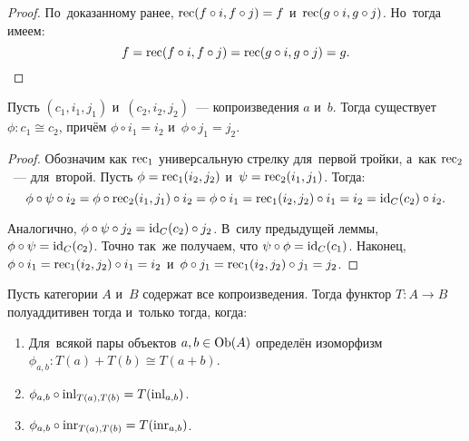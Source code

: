 \documentclass[a4paper,oneside]{article}
\begin{document}
\begin{proof}
    По~доказанному ранее, $\mathrm{rec}(f \circ i, f \circ j) = f$ и~$\mathrm{rec}(g \circ i, g \circ j)$.
    Но~тогда имеем:
    $$
        f = \mathrm{rec}(f \circ i, f \circ j) = \mathrm{rec}(g \circ i, g \circ j) = g.
    $$
\end{proof}

\begin{lemma*}
    Пусть $(c_1, i_1, j_1)$ и~$(c_2, i_2, j_2)$~— копроизведения $a$ и~$b$.
    Тогда существует $\phi : c_1 \cong c_2$, причём $\phi \circ i_1 = i_2$
    и~$\phi \circ j_1 = j_2$.
\end{lemma*}

\begin{proof}
    Обозначим как $\mathrm{rec}_1$ универсальную стрелку для~первой тройки,
    а~как $\mathrm{rec}_2$~— для~второй. Пусть $\phi = \mathrm{rec}_1(i_2, j_2)$
    и~$\psi = \mathrm{rec}_2(i_1, j_1)$. Тогда:
    $$
        \phi \circ \psi \circ i_2 = \phi \circ \mathrm{rec}_2(i_1, j_1) \circ i_2
                                  = \phi \circ i_1
                                  = \mathrm{rec}_1(i_2, j_2) \circ i_1
                                  = i_2
                                  = \mathrm{id}_C(c_2) \circ i_2.
    $$

    Аналогично, $\phi \circ \psi \circ j_2 = \mathrm{id}_C(c_2) \circ j_2$.
    В~силу предыдущей леммы, $\phi \circ \psi = \mathrm{id}_C(c_2)$.
    Точно так~же получаем, что $\psi \circ \phi = \mathrm{id}_C(c_1)$.
    Наконец, $\phi \circ i_1 = \mathrm{rec}_1(i_2, j_2) \circ i_1 = i_2$
    и~$\phi \circ j_1 = \mathrm{rec}_1(i_2, j_2) \circ j_1 = j_2$.
\end{proof}

\begin{theorem*}
    Пусть категории $A$ и~$B$ содержат все копроизведения.
    Тогда функтор $T : A \rightarrow B$ полуаддитивен тогда и~только тогда, когда:
    \begin{enumerate}
        \item Для~всякой пары объектов $a, b \in \mathrm{Ob}(A)$ определён изоморфизм $\phi_{a, b} : T(a) + T(b) \cong T(a + b)$.
        \item $\phi_{a, b} \circ \mathrm{inl}_{T(a), T(b)} = T(\mathrm{inl}_{a, b})$.
        \item $\phi_{a, b} \circ \mathrm{inr}_{T(a), T(b)} = T(\mathrm{inr}_{a, b})$.
    \end{enumerate}
\end{theorem*}
\end{document}
